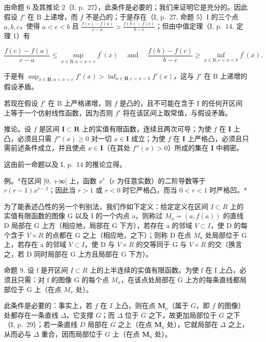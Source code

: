 由命题 6 及其推论 2（I, p.~27），此条件是必要的；我们来证明它是充分的。因此假设 \(f'\) 在 B 上递增，而 \(f\) 不是凸的；于是存在（I, p.~27, 命题 5）I 的三个点 \(a, b, c\)，使得 \(a < c < b\) 且 \(\frac{f(c) - f(a)}{c - a} > \frac{f(b) - f(c)}{b - c}\)；但由中值定理（I, p.~14, 定理 1）有

\[
\frac {f (c) - f (a)}{c - a} \leqslant \sup _ {x \in \mathrm{B}, a <   x <   c} f ^ {\prime} (x) \quad \text { and } \quad \frac {f (b) - f (c)}{b - c} \geqslant \inf _ {x \in \mathrm{B}, c <   x <   b} f ^ {\prime} (x).
\]

于是有 \(\sup_{x\in \mathbf{B},a < x < c}f'(x) > \inf_{x\in \mathbf{B},c < x < b}f'(x)\)，这与 \(f'\) 在 B 上递增的假设矛盾。

若现在假设 \(f'\) 在 B 上严格递增，则 \(f\) 是凸的，且不可能在含于 I 的任何开区间上等于一个仿射线性函数，因为否则 \(f'\) 将在该区间上取常值，与假设矛盾。

推论。设 \(f\) 是区间 \(\mathbf{I} \subset \mathbf{R}\) 上的实值有限函数，连续且两次可导；为使 \(f\) 在 \(\mathbf{I}\) 上凸，必须且只需 \(f''(x) \geqslant 0\) 对一切 \(x \in \mathbf{I}\) 成立；为使 \(f\) 在 \(\mathbf{I}\) 上严格凸，必须且只需前述条件成立，并且使点 \(x \in \mathbf{I}\)（在其处 \(f''(x) > 0\)）所成的集在 \(\mathbf{I}\) 中稠密。

这由前一命题以及 I, p.~14 的推论立得。

例。*在区间 {]}0, +∞{[} 上，函数 \(x^r\)（r 为任意实数）的二阶导数等于 \(r(r - 1)x^{r - 2}\)；因此当 \(r > 1\) 或 \(r < 0\) 时它严格凸，而当 \(0 < r < 1\) 时严格凹。*

为了能表述凸性的另一个判别法，我们作如下定义：给定定义在区间 \(I \subset R\) 上的实值有限函数的图像 G 以及 I 的一个内点 a，则称过 \(M_{a} = (a, f(a))\) 的直线 D 局部在 G 上方（相应地，局部在 G 下方），若存在 a 的邻域 \(V \subset I\)，使 D 的每个含于 \(V \times R\) 的点都在 G 之上（相应地，之下）；则称 D 在点 \(M_{a}\) 处局部位于 G 上，若存在 a 的邻域 \(V \subset I\)，使 D 与 \(V \times R\) 的交等同于 G 与 \(V \times R\) 的交（换言之，若 D 同时局部在 G 上方且局部在 G 下方）。

命题 9. 设 f 是开区间 \(I \subset R\) 上的上半连续的实值有限函数。为使 f 在 I 上凸，必须且只需：对 f 的图像 G 的每个点 \(M_{x}\)，在该点处局部在 G 上方的每条直线都局部位于 G 上（在点 \(M_{x}\) 处）。

此条件是必要的：事实上，若 \(f\) 在 \(I\) 上凸，则在点 \(\mathbf{M}_a\)（属于 \(G\)，即 \(f\) 的图像）处都存在一条直线 \(\Delta\)，它支撑 \(G\)；而 \(\Delta\) 位于 \(G\) 之下，故更加局部位于 \(G\) 之下（I, p.~29）；若一条直线 \(D\) 局部在 \(G\) 之上（在点 \(\mathbf{M}_a\) 处），它就局部在 \(\Delta\) 之上，从而必与 \(\Delta\) 重合，因而局部位于 \(G\) 上（在点 \(\mathbf{M}_a\) 处）。

